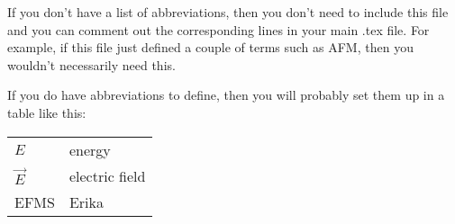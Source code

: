 If you don't have a list of abbreviations, then you don't need to include this file and you can comment out the corresponding lines in your main .tex file.  For example, if this file just defined a couple of terms such as AFM, then you wouldn't necessarily need this.

If you do have abbreviations to define, then you will probably set them up in a table like this:

\begin{tabular}{ll}
  $E$ & energy\\
  $\vec{E}$ & electric field\\
  EFMS & Erika\\
\end{tabular}

